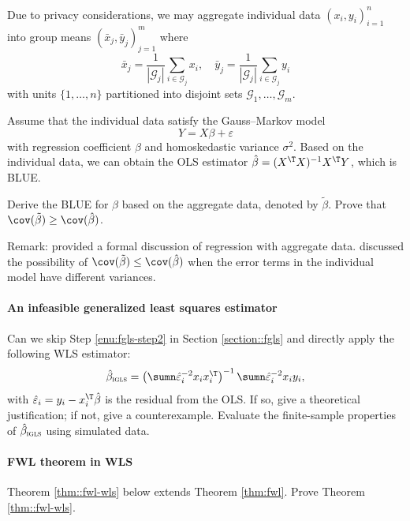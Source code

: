 Due to privacy considerations, we may aggregate individual data $(x_i, y_i)_{i=1}^n$ into group means $(\bar{x}_j, \bar{y}_j)_{j=1}^m$ where 
$$
\bar{x}_j = \frac{1}{  |\mathcal{G}_j|  } \sum_{i \in \mathcal{G}_j} x_i,\quad
\bar{y}_j = \frac{1}{  |\mathcal{G}_j|  } \sum_{i \in \mathcal{G}_j} y_i
$$
with units $\{1, \ldots, n\}$ partitioned into disjoint sets $\mathcal{G}_1, \ldots, \mathcal{G}_m$. 

Assume that the individual data satisfy the Gauss--Markov model
$$
Y = X\beta  + \varepsilon
$$
with regression coefficient $\beta$ and homoskedastic variance $\sigma^2$. 
Based on the  individual data, we can obtain the OLS estimator $\hat\beta = (X^{\T} X)^{-1} X^{\T} Y $, which is BLUE.


Derive the BLUE for $\beta$ based on the aggregate data, denoted by $\tilde{\beta}$. Prove that $\cov(\tilde{\beta}) \geq \cov(\hat\beta)$. 


Remark: \citet{prais1954grouping} provided a formal discussion of regression with aggregate data. \citet{lancaster1968grouping} discussed the possibility of $\cov(\tilde{\beta}) \leq \cov(\hat\beta)$ when the error terms in the individual model have different variances. 





\paragraph{An infeasible generalized least squares estimator}

Can we skip Step \ref{enu:fgls-step2} in Section \ref{section::fgls} and directly apply the following
WLS estimator:
\[
\hat{\beta}_{\textsc{igls}}=\left(\sumn\hat{\varepsilon}_{i}^{-2}x_{i}x_{i}^{\T}\right)^{-1}\sumn\hat{\varepsilon}_{i}^{-2}x_{i}y_{i} , 
\]
with $\hat{\varepsilon}_i = y_i - x_i^{\T} \hat{\beta}$ is the residual from the OLS. 
If so, give a theoretical justification; if not, give a counterexample. Evaluate the finite-sample properties of $\hat{\beta}_{\textsc{igls}}$ using simulated data.


\paragraph{FWL theorem in WLS}\label{hw16::fwl-wls}

Theorem \ref{thm::fwl-wls} below extends Theorem \ref{thm:fwl}. Prove Theorem \ref{thm::fwl-wls}. 


